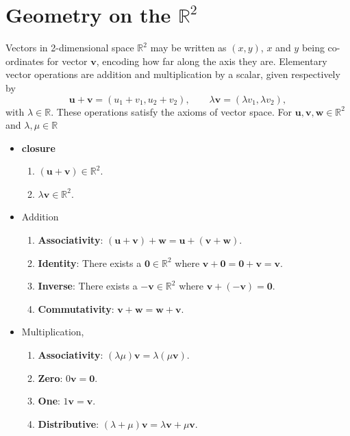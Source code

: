 \documentclass[letter-paper]{tufte-book}
\newcommand{\ub}{\boldsymbol{u}}
\newcommand{\vb}{\boldsymbol{v}}
\newcommand{\wb}{\boldsymbol{w}}
\newcommand\Def[1]{\textbf{#1}}
\begin{document}

\chapter{Geometry on the $\mathbb{R}^2$}

Vectors in 2-dimensional space $\mathbb{R}^{2}$ may be written as $(x,y)$, $x$
and $y$ being co-ordinates for vector $\vb$, encoding how far along the axis
they are. Elementary vector operations are addition and multiplication by a
scalar, given respectively by
\begin{equation}
	\ub+\vb=(u_1 + v_1, u_2 + v_2),\qquad 
	\lambda\vb=(\lambda v_1, \lambda v_2),
\end{equation}
with $\lambda\in\mathbb{R}$. These operations satisfy the axioms of vector
space. For $\ub,\vb,\wb\in\mathbb{R}^2$ and $\lambda,\mu\in\mathbb{R}$
\begin{itemize}
	\item \Def{closure}
	\begin{enumerate}
		\item $(\ub+\vb)\in\mathbb{R}^2$.
		\item $\lambda\vb\in\mathbb{R}^2$.
	\end{enumerate}
	\item Addition
	\begin{enumerate}
		\item \Def{Associativity}: $(\ub+\vb)+\wb=\ub+(\vb+\wb)$.
		\item \Def{Identity}: There exists a $\mathbf{0}\in\mathbb{R}^2$
		where $\vb+\mathbf{0}=\mathbf{0}+\vb=\vb$.
		\item \Def{Inverse}: There exists a $-\vb\in\mathbb{R}^2$ where
		$\vb+(-\vb)=\mathbf{0}$.
		\item \Def{Commutativity}: $\vb+\wb=\wb+\vb$.
	\end{enumerate}
	\item Multiplication,
	\begin{enumerate}
		\item \Def{Associativity}: $(\lambda\mu)\vb=\lambda(\mu\vb)$.
		\item \Def{Zero}: $0\vb=\mathbf{0}$.
		\item \Def{One}: $1\vb=\vb$.
		\item \Def{Distributive}: $(\lambda+\mu)\vb=\lambda\vb+\mu\vb$.
	\end{enumerate}
\end{itemize}
\end{document}
